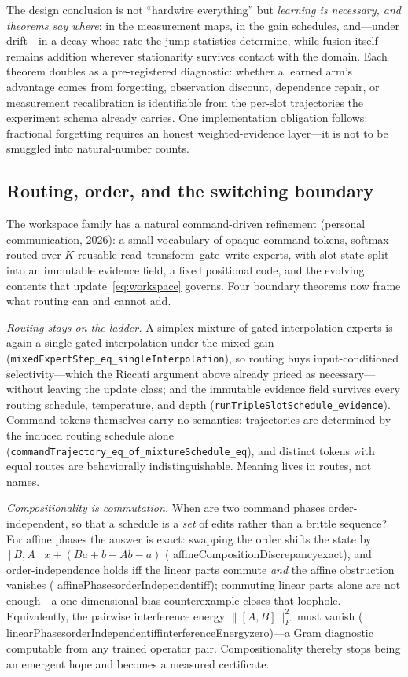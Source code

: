 \documentclass[11pt]{article}
\newcommand{\code}[1]{\texttt{#1}}
\newcommand{\leanname}[1]{{\scriptsize\ttfamily
  \def\_{\textunderscore\allowbreak}#1}}
\begin{document}
The design conclusion is not ``hardwire everything'' but \emph{learning is necessary,
and theorems say where}: in the measurement maps, in the gain schedules, and---under
drift---in a decay whose rate the jump statistics determine, while fusion itself
remains addition wherever stationarity survives contact with the domain. Each theorem
doubles as a pre-registered diagnostic: whether a learned arm's advantage comes from
forgetting, observation discount, dependence repair, or measurement recalibration is
identifiable from the per-slot trajectories the experiment schema already carries. One
implementation obligation follows: fractional forgetting requires an honest
weighted-evidence layer---it is not to be smuggled into natural-number counts.

\subsection{Routing, order, and the switching boundary}
\label{sec:routing}

The workspace family has a natural command-driven refinement (personal communication,
2026): a small vocabulary of opaque command tokens, softmax-routed over $K$ reusable
read--transform--gate--write experts, with slot state split into an immutable evidence
field, a fixed positional code, and the evolving contents that
update~\eqref{eq:workspace} governs. Four boundary theorems now frame what routing can
and cannot add.

\emph{Routing stays on the ladder.} A simplex mixture of gated-interpolation experts is
again a single gated interpolation under the mixed gain
(\code{mixedExpertStep\_eq\_singleInterpolation}), so routing buys input-conditioned
selectivity---which the Riccati argument above already priced as necessary---without
leaving the update class; and the immutable evidence field survives every routing
schedule, temperature, and depth (\code{runTripleSlotSchedule\_evidence}). Command
tokens themselves carry no semantics: trajectories are determined by the induced
routing schedule alone (\code{commandTrajectory\_eq\_of\_mixtureSchedule\_eq}), and
distinct tokens with equal routes are behaviorally indistinguishable. Meaning lives in
routes, not names.

\emph{Compositionality is commutation.} When are two command phases order-independent,
so that a schedule is a \emph{set} of edits rather than a brittle sequence? For affine
phases the answer is exact: swapping the order shifts the state by
$[B,A]\,x + (Ba + b - Ab - a)$
(\leanname{affineCompositionDiscrepancy\_exact}), and
order-independence holds iff the linear parts commute \emph{and} the affine obstruction
vanishes (\leanname{affinePhases\_orderIndependent\_iff}); commuting linear parts alone are
not enough---a one-dimensional bias counterexample closes that loophole. Equivalently,
the pairwise interference energy $\lVert[A,B]\rVert_F^{2}$ must vanish
(\leanname{linearPhases\_orderIndependent\_iff\_interferenceEnergy\_zero})---a Gram
diagnostic computable from any trained operator pair. Compositionality thereby stops
being an emergent hope and becomes a measured certificate.
\end{document}
